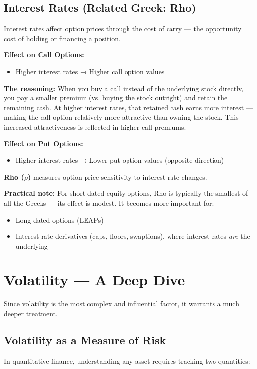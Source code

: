 \documentclass[12pt,openany]{book}
\theoremstyle{definition}
\theoremstyle{remark}
\begin{document}
\medskip
\subsection{Interest Rates (Related Greek: Rho)}
Interest rates affect option prices through the cost of carry --- the opportunity cost of holding or financing a position.

\textbf{Effect on Call Options:}

\begin{itemize}
\item Higher interest rates → Higher call option values


\end{itemize}
\textbf{The reasoning:} When you buy a call instead of the underlying stock directly, you pay a smaller premium (vs. buying the stock outright) and retain the remaining cash. At higher interest rates, that retained cash earns more interest --- making the call option relatively more attractive than owning the stock. This increased attractiveness is reflected in higher call premiums.

\textbf{Effect on Put Options:}

\begin{itemize}
\item Higher interest rates → Lower put option values (opposite direction)


\end{itemize}
\textbf{Rho (\(\rho\))} measures option price sensitivity to interest rate changes.

\textbf{Practical note:} For short-dated equity options, Rho is typically the smallest of all the Greeks --- its effect is modest. It becomes more important for:

\begin{itemize}
\item Long-dated options (LEAPs)


\item Interest rate derivatives (caps, floors, swaptions), where interest rates \emph{are} the underlying


\end{itemize}
\medskip
\section{Volatility --- A Deep Dive}
Since volatility is the most complex and influential factor, it warrants a much deeper treatment.

\subsection{Volatility as a Measure of Risk}
In quantitative finance, understanding any asset requires tracking two quantities:
\end{document}
